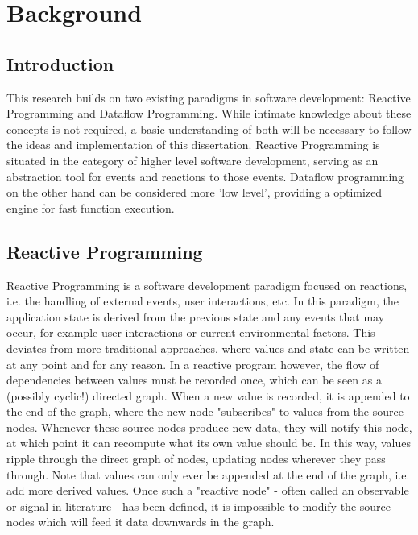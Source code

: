 
\chapter{Background}

\section{Introduction}

This research builds on two existing paradigms in software development: Reactive Programming and Dataflow Programming. While intimate knowledge about these concepts is not required, a basic understanding of both will be necessary to follow the ideas and implementation of this dissertation. Reactive Programming is situated in the category of higher level software development, serving as an abstraction tool for events and reactions to those events. Dataflow programming on the other hand can be considered more 'low level', providing a optimized engine for fast function execution.  

\newpage

\section{Reactive Programming}

Reactive Programming is a software development paradigm focused on reactions, i.e. the handling of external events, user interactions, etc.  In this paradigm, the application state is derived from the previous state and any events that may occur, for example user interactions or current environmental factors. This deviates from more traditional approaches, where values and state can be written at any point and for any reason. In a reactive program however, the flow of dependencies between values must be recorded once, which can be seen as a (possibly cyclic!) directed graph. When a new value is recorded, it is appended to the end of the graph, where the new node "subscribes" to values from the source nodes.
Whenever these source nodes produce new data, they will notify this node, at which point it can recompute what its own value should be. In this way, values ripple through the direct graph of nodes, updating nodes wherever they pass through. Note that values can only ever be appended at the end of the graph, i.e. add more derived values. Once such a "reactive node" - often called an observable or signal in literature - has been defined, it is impossible to modify the source nodes which will feed it data downwards in the graph. 

